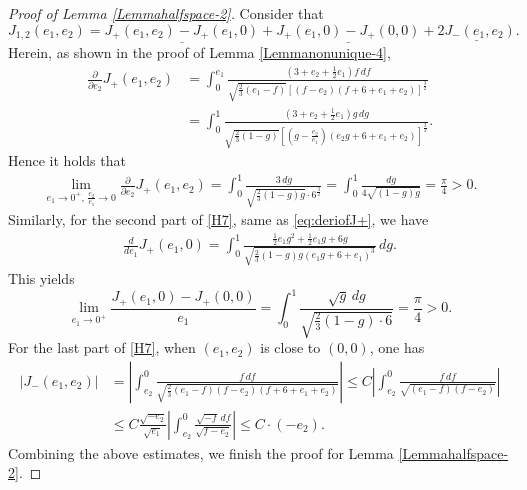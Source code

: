 \documentclass[reqno,12pt]{amsart}
\begin{document}
\begin{proof}[Proof of Lemma \ref{Lemmahalfspace-2}]
Consider that 
\begin{equation}\label{H7}
    J_{1, 2}(e_1, e_2) =  \underline{J_{+}(e_1, e_2) - J_{+}(e_1, 0) } + \underline{J_{+}(e_1, 0)- J_{+}(0, 0) }+ \underline{ 2J_{-}(e_1, e_2)}. 
\end{equation}
Herein, as shown in the proof of Lemma \ref{Lemmanonunique-4}, 
\begin{align*}
    \frac{\partial}{\partial e_2}J_{+}(e_1, e_2) & = \int_0^{e_1} \frac{(3+ e_2 + \frac12 e_1) f\, df }{\sqrt{\frac23 (e_1 -f)} [(f-e_2) (f+ 6+ e_1 + e_2)]^{\frac32}}  \\
    & = \int_0^1 \frac{ (3+ e_2 + \frac12 e_1) g\, dg }{ \sqrt{\frac23(1-g)} \left[ ( g -\frac{e_2}{e_1}) (e_2 g + 6 + e_1 +e_2) \right]^{\frac32}} . 
\end{align*}
Hence it holds that
\begin{equation*}
\begin{aligned}
     \lim_{e_1\to 0^+, \, \frac{e_2}{e_1}\to 0} \frac{\partial}{\partial e_2} J_{+}(e_1, e_2) 
     = \int_0^1 \frac{3 \, dg}{\sqrt{\frac23(1-g) g} \cdot 6^{\frac32}} = \int_0^1 \frac{ dg}{4\sqrt{(1-g)g}}=\frac{\pi}{4}>0.
\end{aligned}
 \end{equation*}
Similarly, for the second part of \eqref{H7}, same as \eqref{eq:deriofJ+}, we have
\begin{align*}
    \frac{d}{de_1}J_{+}(e_1, 0) = \int_0^1 \frac{\frac12 e_1 g^2 +\frac12 e_1 g + 6g}{\sqrt{\frac23 (1-g) g (e_1 g + 6 +e_1)^3}} \, dg.
\end{align*}
This yields
\begin{equation*}
    \lim_{e_1 \to 0^+ }\frac{J_{+}(e_1, 0) - J_{+}(0, 0)}{e_1} = \int_0^1 \frac{ \sqrt{g}\, dg}{\sqrt{\frac23 (1-g) \cdot 6}} =\frac{\pi}{4}>0. 
\end{equation*}
For the last part of \eqref{H7}, when $(e_1, e_2)$ is close to $(0, 0)$, one has
\begin{equation*}
\begin{aligned}
      \left| J_{-}(e_1, e_2) \right| &= \left| \int_{e_2}^0 \frac{f\, df}{\sqrt{\frac23 (e_1-f) (f-e_2)(f+6+e_1 +e_2)}}  \right|
    \leq C   \left| \int_{e_2}^0 \frac{f \, df }{\sqrt{(e_1-f)(f-e_2)}}   \right|\\
  & \leq C \frac{\sqrt{-e_2}}{\sqrt{e_1}}\left| \int_{e_2}^0 \frac{\sqrt{-f} \, df }{\sqrt{f-e_2}}   \right| \leq C \cdot (-e_2). 
\end{aligned}
\end{equation*}
Combining the above estimates, we finish the proof for Lemma \ref{Lemmahalfspace-2}. 
\end{proof}
\end{document}
